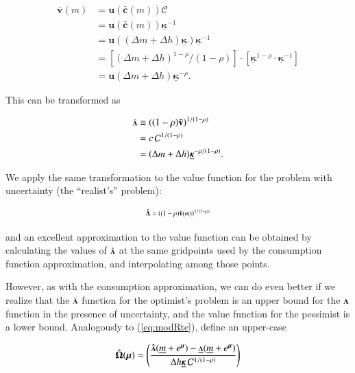 \documentclass[twocolumn, switch]{article}
\newcommand{\uFunc}{\mathbf{u}}
\newcommand{\CRRA}{\rho}
\newcommand{\cNrm}{c}
\newcommand{\mNrm}{m}
\newcommand{\vFunc}{\mathbf{v}}
\newcommand{\vInv}{{\scriptsize \boldsymbol{\Lambda}}}
\newcommand{\vInvOpt}{\bar{\vInv}}
\newcommand{\vInvReal}{\hat{\vInv}}
\newcommand{\cFunc}{\mathbf{c}}
\newcommand{\cFuncOpt}{\bar{\cFunc}}
\newcommand{\hNrm}{h}
\newcommand{\MPC}{\boldsymbol{\kappa}}
\newcommand{\MPCmin}{\underline{\MPC}}
\newcommand{\mNrmMin}{\underline{\mNrm}}
\newcommand{\logmNrmEx}{\boldsymbol{\mu}}
\newcommand{\mNrmEx}{\Delta \mNrm}
\newcommand{\hNrmEx}{\Delta \hNrm}
\newcommand{\PDVCoverc}{\mathcal{C}}
\newcommand{\vFuncOpt}{\bar{\vFunc}}
\newcommand{\vFuncReal}{\hat{\vFunc}}
\newcommand{\vInvPes}{\underline{\vInv}}
\newcommand{\valModRte}{\boldsymbol{\Omega}}
\newcommand{\valModRteReal}{\hat{\valModRte}}
\begin{document}
\begin{equation}
\label{eq:vFuncPF}
\begin{aligned}
\vFuncOpt(\mNrm) &= \uFunc(\cFuncOpt(\mNrm))\PDVCoverc \\
&= \uFunc(\cFuncOpt(\mNrm))\MPCmin^{-1} \\
&= \uFunc((\mNrmEx+\hNrmEx)\MPCmin) \MPCmin^{-1} \\
&= \left[(\mNrmEx+\hNrmEx)^{1-\CRRA}/(1-\CRRA)\right] \cdot \left[\MPCmin^{1-\CRRA} \cdot \MPCmin^{-1}\right] \\
&= \uFunc(\mNrmEx+\hNrmEx)\MPCmin^{-\CRRA}.
\end{aligned}
\end{equation}

This can be transformed as

\begin{equation}
\begin{aligned}
\vInvOpt &\equiv  \left((1-\CRRA)\vFuncOpt\right)^{1/(1-\CRRA)}   \\
&= \cNrm\,\PDVCoverc^{1/(1-\CRRA)} \\
&= (\mNrmEx+\hNrmEx)\MPCmin^{-\CRRA/(1-\CRRA)}.
\end{aligned}
\end{equation}

We apply the same transformation to the value function for the problem with
uncertainty (the ``realist's'' problem):

\begin{equation}
\vInvReal = \left((1-\CRRA)\vFuncReal(\mNrm)\right)^{1/(1-\CRRA)}
\end{equation}

and an excellent approximation to the value function can be obtained by
calculating the values of $\vInvReal$ at the same gridpoints used by the
consumption function approximation, and interpolating among those points.

However, as with the consumption approximation, we can do even better if we
realize that the $\vInvOpt$ function for the optimist's problem is an upper
bound for the $\vInv$ function in the presence of uncertainty, and the value
function for the pessimist is a lower bound. Analogously to (\ref{eq:modRte}),
define an upper-case

\begin{equation}
\label{eq:valModRteReal}
\valModRteReal(\logmNrmEx) = \left(\frac{\vInvReal(\mNrmMin+e^{\logmNrmEx})-\vInvPes(\mNrmMin+e^{\logmNrmEx})}{\hNrmEx \MPCmin \,\PDVCoverc^{1/(1-\CRRA)}}\right)
\end{equation}
\end{document}
